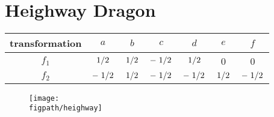 \documentclass[12pt,a4paper]{article}
\newcommand{\figpath}{../fig}
\begin{document}
    \section{Heighway Dragon}
    \begin{table}
        \centering
        \begin{tabular}{|c|c|c|c|c|c|c|}
            \hline
            transformation & $a$ & $b$ & $c$ & $d$ & $e$ & $f$ \\
            \hline
            $f_1$ & $\flatfrac{1}{2}$ & $\flatfrac{1}{2}$ & $-\flatfrac{1}{2}$ & $\flatfrac{1}{2}$ & 0 & 0 \\
            \hline
            $f_2$ & $-\flatfrac{1}{2}$ & $\flatfrac{1}{2}$ & $-\flatfrac{1}{2}$ & $-\flatfrac{1}{2}$ & $\flatfrac{1}{2}$ & $-\flatfrac{1}{2}$ \\
            \hline
        \end{tabular}
    \end{table}
    \begin{figure}
        \centering
        \texttt{[image: \\figpath/heighway]}
    \end{figure}
    \begin{figure}
        \centering
    \end{figure}
\end{document}
